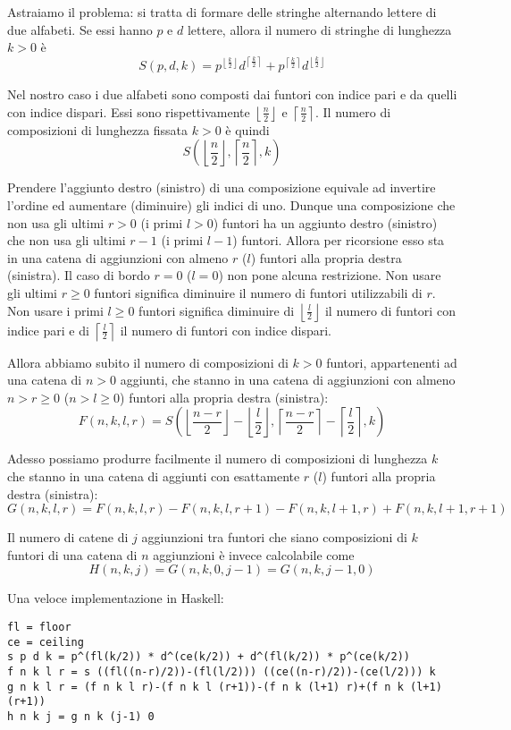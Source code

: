 Astraiamo il problema: si tratta di formare delle stringhe alternando lettere di due alfabeti. Se essi hanno $p$ e $d$ lettere, allora il numero di stringhe di lunghezza $k>0$ è
\[
S(p,d,k)
=
p^{\left\lfloor\frac{k}{2}\right\rfloor}
d^{\left\lceil\frac{k}{2}\right\rceil}
+
p^{\left\lceil\frac{k}{2}\right\rceil}
d^{\left\lfloor\frac{k}{2}\right\rfloor}
\]

Nel nostro caso i due alfabeti sono composti dai funtori con indice pari e da quelli con indice dispari.
Essi sono rispettivamente $\left\lfloor\frac{n}{2}\right\rfloor$ e $\left\lceil\frac{n}{2}\right\rceil$.
Il numero di composizioni di lunghezza fissata $k>0$ è quindi
\[
S\left(\left\lfloor\frac{n}{2}\right\rfloor,\left\lceil\frac{n}{2}\right\rceil,k\right)
\]

Prendere l'aggiunto destro (sinistro) di una composizione equivale ad invertire l'ordine ed aumentare (diminuire) gli indici di uno.
Dunque una composizione che non usa gli ultimi $r>0$ (i primi $l>0$) funtori ha un aggiunto destro (sinistro) che non usa gli ultimi $r-1$ (i primi $l-1$) funtori.
Allora per ricorsione esso sta in una catena di aggiunzioni con almeno $r$ ($l$) funtori alla propria destra (sinistra). Il caso di bordo $r=0$ ($l=0$) non pone alcuna restrizione.
Non usare gli ultimi $r\geq0$ funtori significa diminuire il numero di funtori utilizzabili di $r$.
Non usare i primi $l\geq0$ funtori significa diminuire di $\left\lfloor\frac{l}{2}\right\rfloor$ il numero di funtori con indice pari e di $\left\lceil\frac{l}{2}\right\rceil$ il numero di funtori con indice dispari.

Allora abbiamo subito il numero di composizioni di $k>0$ funtori, appartenenti ad una catena di $n>0$ aggiunti, che stanno in una catena di aggiunzioni con almeno $n>r\geq0$ ($n>l\geq0$) funtori alla propria destra (sinistra):
\[
F(n,k,l,r)=
S\left(
\left\lfloor\frac{n-r}{2}\right\rfloor-\left\lfloor\frac{l}{2}\right\rfloor
,
\left\lceil\frac{n-r}{2}\right\rceil-\left\lceil\frac{l}{2}\right\rceil
,
k\right)
\]

Adesso possiamo produrre facilmente il numero di composizioni di lunghezza $k$ che stanno in una catena di aggiunti con esattamente $r$ ($l$) funtori alla propria destra (sinistra):
\[
G(n,k,l,r)=
F(n,k,l,r)-F(n,k,l,r+1)
-F(n,k,l+1,r)+F(n,k,l+1,r+1)
\]

Il numero di catene di $j$ aggiunzioni tra funtori che siano composizioni di $k$ funtori di una catena di $n$ aggiunzioni è invece calcolabile come
\[
H(n,k,j)=G(n,k,0,j-1)=G(n,k,j-1,0)
\]

Una veloce implementazione in Haskell:
\begin{verbatim}
fl = floor
ce = ceiling
s p d k = p^(fl(k/2)) * d^(ce(k/2)) + d^(fl(k/2)) * p^(ce(k/2))
f n k l r = s ((fl((n-r)/2))-(fl(l/2))) ((ce((n-r)/2))-(ce(l/2))) k
g n k l r = (f n k l r)-(f n k l (r+1))-(f n k (l+1) r)+(f n k (l+1) (r+1))
h n k j = g n k (j-1) 0
\end{verbatim}
